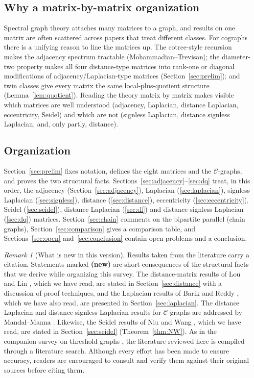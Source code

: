 \documentclass[11pt]{article}
\theoremstyle{plain}
\theoremstyle{definition}
\theoremstyle{remark}
\newtheorem{remark}[theorem]{Remark}
\begin{document}
	\subsection{Why a matrix-by-matrix organization}
	
	Spectral graph theory attaches many matrices to a graph, and results on one matrix are often scattered across papers that treat different classes. For cographs there is a unifying reason to line the matrices up. The cotree-style recursion makes the adjacency spectrum tractable (Mohammadian--Trevisan); the diameter-two property makes all four distance-type matrices into rank-one or diagonal modifications of adjacency/Laplacian-type matrices (Section~\ref{sec:prelim}); and twin classes give every matrix the same local-plus-quotient structure (Lemma~\ref{lem:quotient}). Reading the theory matrix by matrix makes visible which matrices are well understood (adjacency, Laplacian, distance Laplacian, eccentricity, Seidel) and which are not (signless Laplacian, distance signless Laplacian, and, only partly, distance).
	
	\subsection{Organization}
	
	Section~\ref{sec:prelim} fixes notation, defines the eight matrices and the $\mathcal{C}$-graphs, and proves the two structural facts. Sections~\ref{sec:adjacency}--\ref{sec:dq} treat, in this order, the adjacency (Section~\ref{sec:adjacency}), Laplacian (\ref{sec:laplacian}), signless Laplacian (\ref{sec:signless}), distance (\ref{sec:distance}), eccentricity (\ref{sec:eccentricity}), Seidel (\ref{sec:seidel}), distance Laplacian (\ref{sec:dl}) and distance signless Laplacian (\ref{sec:dq}) matrices. Section~\ref{sec:chain} comments on the bipartite parallel (chain graphs), Section~\ref{sec:comparison} gives a comparison table, and Sections~\ref{sec:open} and~\ref{sec:conclusion} contain open problems and a conclusion.
	
	\begin{remark}[What is new in this version]
		\label{rem:new}
		Results taken from the literature carry a citation. Statements marked \textbf{(new)} are short consequences of the structural facts that we derive while organizing this survey. The distance-matrix results of Lou and Lin \cite{LouLin2020}, which we have read, are stated in Section~\ref{sec:distance} with a discussion of proof techniques, and the Laplacian results of Barik and Reddy \cite{BarikReddy2023}, which we have also read, are presented in Section~\ref{sec:laplacian}. The distance Laplacian and distance signless Laplacian results for $\mathcal C$-graphs are addressed by Mandal--Manna \cite{MandalManna2026DLDQ}. Likewise, the Seidel results of Niu and Wang \cite{NiuWang2024}, which we have read, are stated in Section~\ref{sec:seidel} (Theorem~\ref{thm:NW}). As in the companion survey on threshold graphs \cite{MannaMandal2026}, the literature reviewed here is compiled through a literature search. Although every effort has been made to ensure accuracy, readers are encouraged to consult and verify them against their original sources before citing them.
	\end{remark}
	
\end{document}
